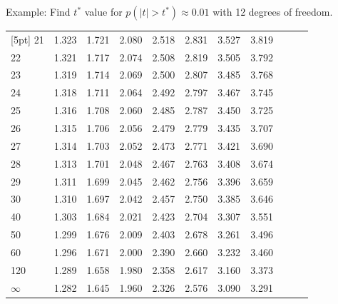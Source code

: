 \begin{frame}{\small Example: Find $t^*$ value for $p(|t|>t^*)
\approx 0.01$ with 12 degrees of freedom.}
{\begin{tabular}{l|llllllllll}
[5pt]
21 & 1.323 & 1.721 & 2.080 & 2.518 & 2.831 & 3.527 & 3.819 \\ 
22 & 1.321 & 1.717 & 2.074 & 2.508 & 2.819 & 3.505 & 3.792 \\ 
23 & 1.319 & 1.714 & 2.069 & 2.500 & 2.807 & 3.485 & 3.768 \\ 
24 & 1.318 & 1.711 & 2.064 & 2.492 & 2.797 & 3.467 & 3.745 \\ 
25 & 1.316 & 1.708 & 2.060 & 2.485 & 2.787 & 3.450 & 3.725 \\ 
[5pt]
26 & 1.315 & 1.706 & 2.056 & 2.479 & 2.779 & 3.435 & 3.707 \\ 
27 & 1.314 & 1.703 & 2.052 & 2.473 & 2.771 & 3.421 & 3.690 \\ 
28 & 1.313 & 1.701 & 2.048 & 2.467 & 2.763 & 3.408 & 3.674 \\ 
29 & 1.311 & 1.699 & 2.045 & 2.462 & 2.756 & 3.396 & 3.659 \\ 
30 & 1.310 & 1.697 & 2.042 & 2.457 & 2.750 & 3.385 & 3.646 \\ 
[5pt]
40 & 1.303 & 1.684 & 2.021 & 2.423 & 2.704 & 3.307 & 3.551 \\ 
50 & 1.299 & 1.676 & 2.009 & 2.403 & 2.678 & 3.261 & 3.496 \\ 
60 & 1.296 & 1.671 & 2.000 & 2.390 & 2.660 & 3.232 & 3.460 \\ 
120 & 1.289 & 1.658 & 1.980 & 2.358 & 2.617 & 3.160 & 3.373 \\ 
$\infty$ & 1.282 & 1.645 & 1.960 & 2.326 & 2.576 & 3.090 & 3.291 
\end{tabular}


}



\end{frame}

